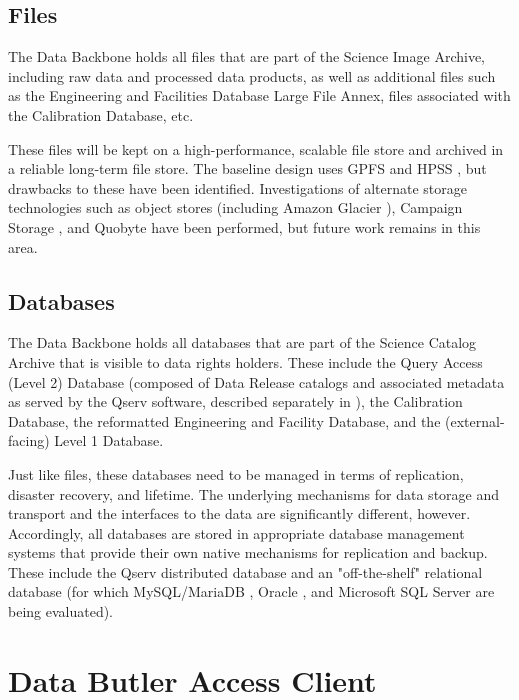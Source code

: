 \documentclass[DM,toc]{lsstdoc}
\begin{document}
\subsection{Files}\label{dbb-files}

The Data Backbone holds all files that are part of the Science Image Archive,
including raw data and processed data products, as well as additional files
such as the Engineering and Facilities Database Large File Annex, files
associated with the Calibration Database, etc.

These files will be kept on a high-performance, scalable file store and
archived in a reliable long-term file store.  The baseline design uses GPFS
\citep{GPFS} and HPSS \citep{HPSS}, but drawbacks to these have been
identified.  Investigations of alternate storage technologies such as object
stores (including Amazon Glacier \citep{AmazonGlacier}), Campaign Storage
\citep{CampaignStorage}, and Quobyte \citep{Quobyte} have been performed, but
future work remains in this area.

\subsection{Databases}\label{dbb-databases}

The Data Backbone holds all databases that are part of the Science Catalog
Archive that is visible to data rights holders.  These include the Query Access
(Level 2) Database (composed of Data Release catalogs and associated metadata
as served by the Qserv software, described separately in ), the
Calibration Database, the reformatted Engineering and Facility Database, and
the (external-facing) Level 1 Database.

Just like files, these databases need to be managed in terms of replication,
disaster recovery, and lifetime.  The underlying mechanisms for data storage
and transport and the interfaces to the data are significantly different,
however.  Accordingly, all databases are stored in appropriate database
management systems that provide their own native mechanisms for replication and
backup.  These include the Qserv distributed database and an "off-the-shelf"
relational database (for which MySQL/MariaDB \citep{MariaDB}, Oracle
\citep{Oracle}, and Microsoft SQL Server \citep{SQLServer} are being
evaluated).


\section{Data Butler Access Client}\label{data-butler-access-client}
\end{document}
